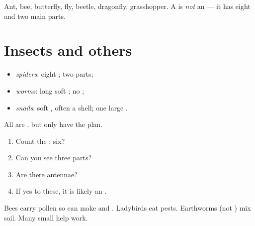 \begin{example}[Insects]\label{ex:g3:insects:examples}
Ant, bee, butterfly, fly, beetle, dragonfly, grasshopper. A 
is \emph{not} an  --- it has eight  and two main 
parts.
\end{example}

\section{Insects and others}

\begin{definition}[Compare]\label{def:g3:insects:compare}
\begin{itemize}
  \item \emph{spiders}: eight ; two  parts;
  \item \emph{worms}: long soft ; no ;
  \item \emph{snails}: soft , often a shell; one
        large .
\end{itemize}
All are , but only  have the  plan.
\end{definition}

\begin{method}[Is it an insect?]\label{met:g3:insects:test}
\begin{enumerate}
  \item Count the : six?
  \item Can you see three  parts?
  \item Are there antennae?
  \item If yes to these, it is likely an .
\end{enumerate}
\end{method}

\begin{example}\label{ex:g3:insects:help}
Bees carry pollen so  can make  and . Ladybirds eat
pests. Earthworms (not ) mix soil. Many small  help
 work.
\end{example}


